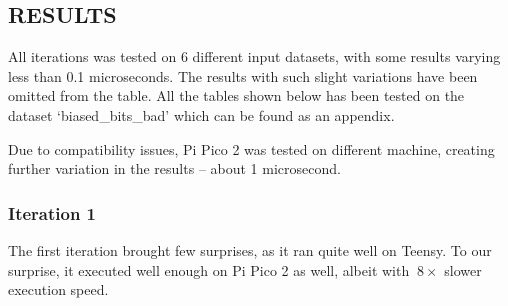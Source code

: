 \documentclass{sigchi}
\begin{document}
\newpage

\subsection{\texorpdfstring{RESULTS }{RESULTS }}\label{results}

All iterations was tested on 6 different input datasets, with some results varying less than 0.1 microseconds. The results with such slight variations have been omitted from the table. All the tables shown below has been tested on the dataset `biased\_bits\_bad' which can be found as an appendix.

Due to compatibility issues, Pi Pico 2 was tested on different machine, creating further variation in the results -- about 1 microsecond.

\subsubsection{Iteration 1}\label{iteration-1}

The first iteration brought few surprises, as it ran quite well on Teensy. To our surprise, it executed well enough on Pi Pico 2 as well, albeit with \(~8\times\) slower execution speed.
\end{document}
